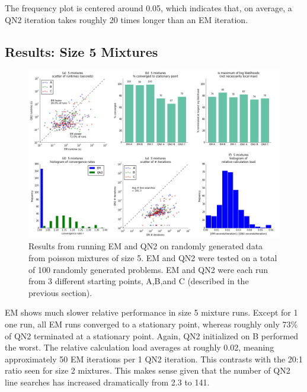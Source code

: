 \documentclass[letter,12pt]{article}
\begin{document}
The frequency plot is centered around 0.05, which indicates that, on average, a QN2 iteration takes roughly 20 times longer than an EM iteration.

\pagebreak
\subsection{Results: Size 5 Mixtures}

\begin{figure}[h]
\centering
\includegraphics[width=16cm]{fig_RunData2_K5_init3.png}
\caption{Results from running EM and QN2 on randomly generated data from poisson mixtures of size 5.  EM and QN2 were tested on a total of 100 randomly generated problems.  EM and QN2 were each run from 3 different starting points, A,B,and C (described in the previous section).}
\end{figure}

EM shows much slower relative performance in size 5 mixture runs.  Except for 1 one run, all EM runs converged to a stationary point, whereas roughly only 73\% of QN2 terminated at a stationary point.  Again, QN2 initialized on B performed the worst.  The relative calculation load averages at roughly 0.02, meaning approximately 50 EM iterations per 1 QN2 iteration.  This contrasts with the 20:1 ratio seen for size 2 mixtures.  This makes sense given that the number of QN2 line searches has increased dramatically from 2.3 to 141.

\pagebreak
\end{document}
